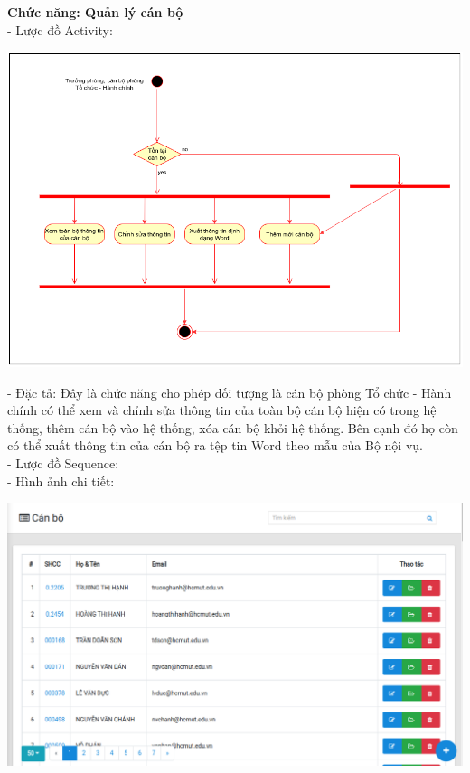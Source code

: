 \textbf{Chức năng: Quản lý cán bộ}\\
- Lược đồ Activity:
\begin{center}
  \captionsetup{type=figure}
  \includegraphics[scale=0.4]{img/UML/TchcStaff/activityQuanLyCanBo.png}
\end{center}
- Đặc tả: Đây là chức năng cho phép đối tượng là cán bộ phòng Tổ chức - Hành chính có thể xem và chỉnh sửa thông tin của toàn bộ cán bộ hiện có trong hệ thống, thêm cán bộ vào hệ thống, xóa cán bộ khỏi hệ thống. Bên cạnh đó họ còn có thể xuất thông tin của cán bộ ra tệp tin Word theo mẫu của Bộ nội vụ.\\
- Lược đồ Sequence:\\
- Hình ảnh chi tiết:
\begin{center}
  \captionsetup{type=figure}
  \includegraphics[scale=0.5]{img/Screen/allcanbo.png}
\end{center}
